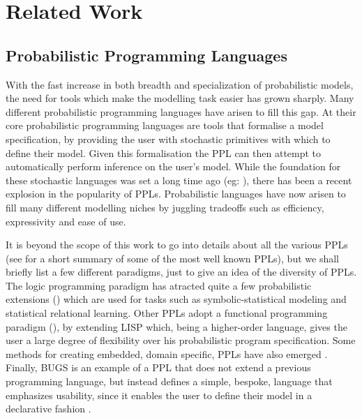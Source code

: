 \chapter{Related Work} 
\label{chap:relWork}

\section{Probabilistic Programming Languages}

With the fast increase in both breadth and specialization of probabilistic models, the need for tools which make the modelling task easier has grown sharply. Many different probabilistic programming languages have arisen to fill this gap. At their core probabilistic programming languages are tools that formalise a model specification, by providing the user with stochastic primitives with which to define their model. Given this formalisation the PPL can then attempt to automatically perform inference on the user's model. While the foundation for these stochastic languages was set a long time ago (eg: \cite{jones1989probabilistic}), there has been a recent explosion in the popularity of PPLs. Probabilistic languages have now arisen to fill many different modelling niches by juggling tradeoffs such as efficiency, expressivity and ease of use. 

It is beyond the scope of this work to go into details about all the various PPLs (see \cite{ppw} for a short summary of some of the most well known PPLs), but we shall briefly list a few different paradigms, just to give an idea of the diversity of PPLs. The logic programming paradigm has atracted quite a few probabilistic extensions (\cite{kimmig2011implementation, de2008probabilistic, sato1997prism, poole2008independent}) which are used for tasks such as symbolic-statistical modeling and statistical relational learning. Other PPLs adopt a functional programming paradigm (\cite{goodman2008church, mansinghka2014venture, wood2014new}), by extending LISP \cite{abelson1991revised} which, being a higher-order language, gives the user a large degree of flexibility over his probabilistic program specification. Some methods for creating embedded, domain specific, PPLs have also emerged \cite{kiselyov2009embedded}. Finally, BUGS is an example of a PPL that does not extend a previous programming language, but instead defines a simple, bespoke, language that emphasizes usability, since it enables the user to define their model in a declarative fashion \cite{lunn2009bugs}.

